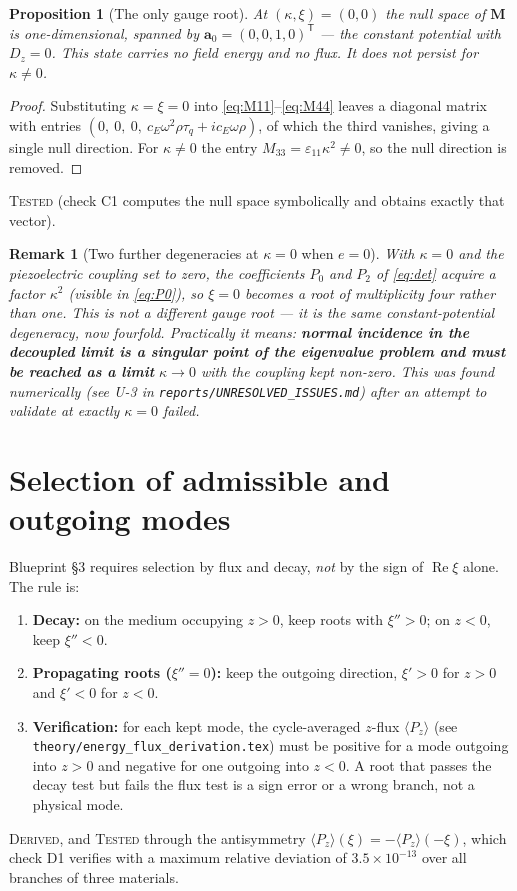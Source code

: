 \documentclass[11pt]{article}
\newcommand{\eps}{\varepsilon}
\theoremstyle{plain}
\newtheorem{proposition}{Proposition}
\newtheorem{remark}{Remark}
\begin{document}
\begin{proposition}[The only gauge root]
\label{prop:gauge}
At $(\kappa,\xi)=(0,0)$ the null space of $\bm{M}$ is one-dimensional, spanned by
$\bm{a}_0=(0,0,1,0)^{\mathsf T}$ --- the constant potential with $D_z=0$. This
state carries no field energy and no flux. It does not persist for $\kappa\neq0$.
\end{proposition}
\begin{proof}
Substituting $\kappa=\xi=0$ into \eqref{eq:M11}--\eqref{eq:M44} leaves a diagonal
matrix with entries $(0,\ 0,\ 0,\ c_E\omega^2\rho\tau_q + ic_E\omega\rho)$, of
which the third vanishes, giving a single null direction. For $\kappa\neq0$ the
entry $M_{33}=\eps_{11}\kappa^2\neq0$, so the null direction is removed.
\end{proof}
\textsc{Tested} (check C1 computes the null space symbolically and obtains exactly
that vector).

\begin{remark}[Two further degeneracies at $\kappa=0$ when $e=0$]
\label{rem:k0-degenerate}
With $\kappa=0$ \emph{and} the piezoelectric coupling set to zero, the coefficients
$P_0$ and $P_2$ of \eqref{eq:det} acquire a factor $\kappa^2$ (visible in
\eqref{eq:P0}), so $\xi=0$ becomes a root of multiplicity four rather than one.
This is not a different gauge root --- it is the same constant-potential
degeneracy, now fourfold. Practically it means: \textbf{normal incidence in the
decoupled limit is a singular point of the eigenvalue problem and must be reached
as a limit} $\kappa\to0$ with the coupling kept non-zero. This was found
numerically (see U-3 in \texttt{reports/UNRESOLVED\_ISSUES.md}) after an attempt
to validate at exactly $\kappa=0$ failed.
\end{remark}

\section{Selection of admissible and outgoing modes}
\label{sec:selection}

Blueprint \S3 requires selection by flux and decay, \emph{not} by the sign of
$\operatorname{Re}\xi$ alone. The rule is:
\begin{enumerate}
  \item \textbf{Decay:} on the medium occupying $z>0$, keep roots with
        $\xi''>0$; on $z<0$, keep $\xi''<0$.
  \item \textbf{Propagating roots ($\xi''=0$):} keep the outgoing direction,
        $\xi'>0$ for $z>0$ and $\xi'<0$ for $z<0$.
  \item \textbf{Verification:} for each kept mode, the cycle-averaged $z$-flux
        $\langle P_z\rangle$ (see \texttt{theory/energy\_flux\_derivation.tex})
        must be positive for a mode outgoing into $z>0$ and negative for one
        outgoing into $z<0$. A root that passes the decay test but fails the flux
        test is a sign error or a wrong branch, not a physical mode.
\end{enumerate}
\textsc{Derived}, and \textsc{Tested} through the antisymmetry
$\langle P_z\rangle(\xi) = -\langle P_z\rangle(-\xi)$, which check D1 verifies
with a maximum relative deviation of $3.5\times10^{-13}$ over all branches of
three materials.
\end{document}
